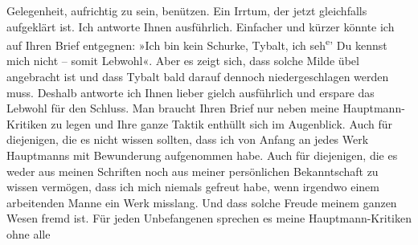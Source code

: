 \begin{ledgroupsized}[t]{13cm}
               Gelegenheit, aufrichtig zu sein, benützen. Ein Irrtum, der jetzt gleichfalls
               aufgeklärt ist.\pend
           \pstart
           Ich antworte Ihnen ausführlich. Einfacher und kürzer {\pb}könnte ich auf Ihren Brief
               entgegnen: »Ich bin kein Schurke,
                  Tybalt, ich seh\substVorne{}\textsuperscript{e}\substDazwischen{}’\substHinten{} Du kennst mich nicht – somit Lebwohl«. Aber es zeigt sich, dass
               solche Milde übel angebracht ist und dass Tybalt bald darauf dennoch niedergeschlagen werden muss.
               Deshalb antworte ich Ihnen lieber gielch ausführlich und erspare das Lebwohl für den
               Schluss.\pend
           \pstart
           Man braucht Ihren Brief nur neben meine Hauptmann-Kritiken zu legen und Ihre
               ganze Taktik enthüllt sich im Augenblick. Auch für diejenigen, die es nicht wissen
               sollten, dass ich von Anfang an jedes Werk Hauptmanns mit Bewunderung aufgenommen habe. Auch für diejenigen, die es
               weder aus meinen Schriften noch aus meiner persönlichen Bekanntschaft zu wissen
               vermögen, dass ich mich niemals gefreut habe, wenn irgendwo einem arbeitenden Manne
               ein Werk misslang. Und dass solche Freude meinem ganzen Wesen fremd ist.\pend
           \pstart
           Für jeden Unbefangenen sprechen es meine Hauptmann-Kritiken ohne alle

\end{ledgroupsized}
